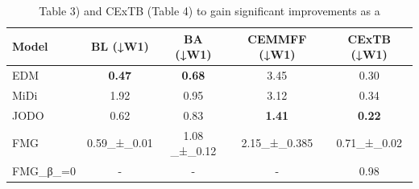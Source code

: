 \begin{table}[t]
\centering
\caption{Table 3) and CExTB (Table 4) to gain significant improvements as a}
\label{tab:2402.15864}
\begin{tabular}{lcccc}
\toprule
Model & BL (↓W1) & BA (↓W1) & CEMMFF (↓W1) & CExTB (↓W1) \\
\midrule
EDM & \textbf{0.47} & \textbf{0.68} & 3.45 & 0.30 \\
MiDi & 1.92 & 0.95 & 3.12 & 0.34 \\
JODO & 0.62 & 0.83 & \textbf{1.41} & \textbf{0.22} \\
FMG & 0.59\_±\_0.01 & 1.08 \_±\_0.12 & 2.15\_±\_0.385 & 0.71\_±\_0.02 \\
FMG\_β\_=0 & - & - & - & 0.98 \\
\bottomrule
\end{tabular}
\end{table}
